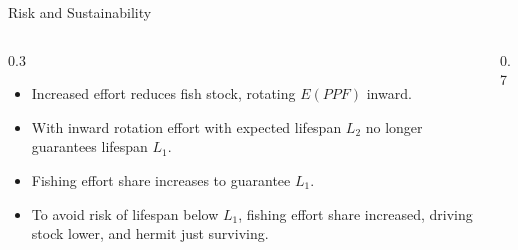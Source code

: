\begin{frame}{Risk and Sustainability}
	\begin{columns}[T]
		\begin{column}{0.3\textwidth}
			\begin{itemize}
				\item Increased effort reduces fish stock, rotating $E(PPF)$ inward.
				\item With inward rotation effort with expected lifespan $L_2$ no longer guarantees lifespan $L_1$.
				\item Fishing effort share increases to guarantee $L_1$.
				\item To avoid risk of lifespan below $L_1$, fishing effort share increased, driving stock lower, and hermit just surviving.
			\end{itemize}
		\end{column}
		\begin{column}{0.7\textwidth}
			\centering
\end{column}
\end{columns}
\end{frame}
